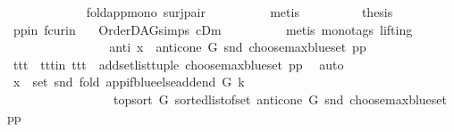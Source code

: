 \begin{isabellebody}
\ \ \ \ \ \ \ \ \ \ \isamarkupfalse%
\ \ fold{\isacharunderscore}{\kern0pt}app{\isacharunderscore}{\kern0pt}mono{}\ surj{\isacharunderscore}{\kern0pt}pair\isanewline
\ \ \ \ \ \ \ \ \isamarkupfalse%
\ {\isacharparenleft}{\kern0pt}metis{\isacharparenright}{\kern0pt}\isanewline
\ \ \ \ \ \ \isamarkupfalse%
\ \isamarkupfalse%
\ {\isacharquery}{\kern0pt}thesis\ \isamarkupfalse%
\ pp{\isacharunderscore}{\kern0pt}in\ fcur{\isacharunderscore}{\kern0pt}in\ \isamarkupfalse%
\ {}\ OrderDAG{\isachardot}{\kern0pt}simps\ cDm\isanewline
\ \ \ \ \ \ \ \ \isamarkupfalse%
\ {\isacharparenleft}{\kern0pt}metis\ {\isacharparenleft}{\kern0pt}mono{\isacharunderscore}{\kern0pt}tags{\isacharcomma}{\kern0pt}\ lifting{\isacharparenright}{\kern0pt}{\isacharparenright}{\kern0pt}\ \isanewline
\ \ \ \ \ \ \isamarkupfalse%
\isanewline
\ \ \ \ \ \ \ \ \isamarkupfalse%
\ anti{\isacharcolon}{\kern0pt}\ {\isachardoublequoteopen}x\ {\isasymin}\ anticone\ G\ {\isacharparenleft}{\kern0pt}snd\ {\isacharparenleft}{\kern0pt}choose{\isacharunderscore}{\kern0pt}max{\isacharunderscore}{\kern0pt}blue{\isacharunderscore}{\kern0pt}set\ pp{\isacharparenright}{\kern0pt}{\isacharparenright}{\kern0pt}{\isachardoublequoteclose}\ \isanewline
\ \ \ \ \ \ \ \ \isamarkupfalse%
\ ttt\ \ ttt{\isacharunderscore}{\kern0pt}in{\isacharcolon}{\kern0pt}\ {\isachardoublequoteopen}ttt\ {\isacharequal}{\kern0pt}\ add{\isacharunderscore}{\kern0pt}set{\isacharunderscore}{\kern0pt}list{\isacharunderscore}{\kern0pt}tuple\ {\isacharparenleft}{\kern0pt}choose{\isacharunderscore}{\kern0pt}max{\isacharunderscore}{\kern0pt}blue{\isacharunderscore}{\kern0pt}set\ pp{\isacharparenright}{\kern0pt}{\isachardoublequoteclose}\ \isamarkupfalse%
\ auto\isanewline
\ \ \ \ \ \ \ \ \isamarkupfalse%
\ {\isachardoublequoteopen}x\ {\isasymin}\ set\ {\isacharparenleft}{\kern0pt}snd\ {\isacharparenleft}{\kern0pt}fold\ {\isacharparenleft}{\kern0pt}app{\isacharunderscore}{\kern0pt}if{\isacharunderscore}{\kern0pt}blue{\isacharunderscore}{\kern0pt}else{\isacharunderscore}{\kern0pt}add{\isacharunderscore}{\kern0pt}end\ G\ k{\isacharparenright}{\kern0pt}\isanewline
\ \ \ \ \ \ \ \ \ \ \ \ \ \ \ \ \ {\isacharparenleft}{\kern0pt}top{\isacharunderscore}{\kern0pt}sort\ G\ {\isacharparenleft}{\kern0pt}sorted{\isacharunderscore}{\kern0pt}list{\isacharunderscore}{\kern0pt}of{\isacharunderscore}{\kern0pt}set\ {\isacharparenleft}{\kern0pt}anticone\ G\ {\isacharparenleft}{\kern0pt}snd\ {\isacharparenleft}{\kern0pt}choose{\isacharunderscore}{\kern0pt}max{\isacharunderscore}{\kern0pt}blue{\isacharunderscore}{\kern0pt}set\ pp{\isacharparenright}{\kern0pt}{\isacharparenright}{\kern0pt}{\isacharparenright}{\kern0pt}{\isacharparenright}{\kern0pt}{\isacharparenright}{\kern0pt}\isanewline

\end{isabellebody}
